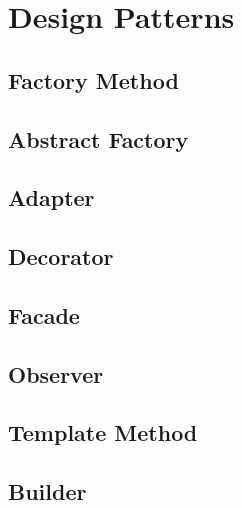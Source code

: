 \section{Design Patterns}


\subsection{Factory Method}


\subsection{Abstract Factory}


\subsection{Adapter}


\subsection{Decorator}


\subsection{Facade}


\subsection{Observer}


\subsection{Template Method}


\subsection{Builder}

